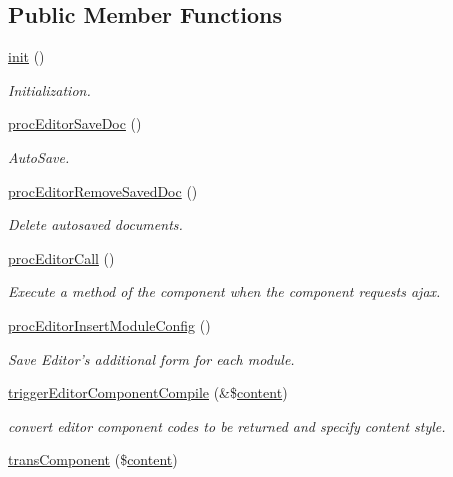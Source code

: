 \subsection*{Public Member Functions}
\begin{DoxyCompactItemize}
\item 
\hyperlink{classeditorController_a40838d463bafa5863b5f966b8828738b}{init} ()
\begin{DoxyCompactList}\small\item\em Initialization. \end{DoxyCompactList}\item 
\hyperlink{classeditorController_a671035df077f460bc8c60dcea0410344}{proc\+Editor\+Save\+Doc} ()
\begin{DoxyCompactList}\small\item\em Auto\+Save. \end{DoxyCompactList}\item 
\hyperlink{classeditorController_a869072fefa3ae722ecc0e0123b5f8bbd}{proc\+Editor\+Remove\+Saved\+Doc} ()
\begin{DoxyCompactList}\small\item\em Delete autosaved documents. \end{DoxyCompactList}\item 
\hyperlink{classeditorController_ab7eab43a1ba21645dabcf36f32b27289}{proc\+Editor\+Call} ()
\begin{DoxyCompactList}\small\item\em Execute a method of the component when the component requests ajax. \end{DoxyCompactList}\item 
\hyperlink{classeditorController_af20e397838bd94b60b09b0cba2d7da0d}{proc\+Editor\+Insert\+Module\+Config} ()
\begin{DoxyCompactList}\small\item\em Save Editor's additional form for each module. \end{DoxyCompactList}\item 
\hyperlink{classeditorController_a6003487c398eae0676e15f5437cebdf8}{trigger\+Editor\+Component\+Compile} (\&\$\hyperlink{classcontent}{content})
\begin{DoxyCompactList}\small\item\em convert editor component codes to be returned and specify content style. \end{DoxyCompactList}\item 
\hyperlink{classeditorController_a9ef6499da56cf876c70813624ae4a2c0}{trans\+Component} (\$\hyperlink{classcontent}{content})

\end{DoxyCompactItemize}
